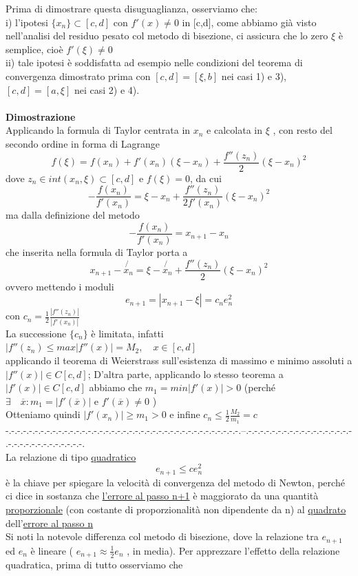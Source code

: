 \documentclass[12pt]{article}
\begin{document}
Prima di dimostrare questa disuguaglianza, osserviamo che:\\
i) l'ipotesi $\{x_n\} \subset [c,d]$ con $f'(x)\neq0$ in [c,d], come abbiamo già visto nell'analisi del residuo pesato col metodo di bisezione, ci assicura che lo zero $\xi$ è semplice, cioè $f'(\xi) \neq 0$\\
ii) tale ipotesi è soddisfatta ad esempio nelle condizioni del teorema di convergenza dimostrato prima con $[c,d] = [\xi, b]$ nei casi 1) e 3), $[c,d] = [a,\xi]$ nei casi 2) e 4).\\\\
\textbf{Dimostrazione}\\
Applicando la formula di Taylor centrata in $x_n$ e calcolata in $\xi $ , con resto del secondo ordine in forma di Lagrange
\[f(\xi)=f(x_n)+f'(x_n)(\xi-x_n)+\frac{f''(z_n)}{2}(\xi-x_n)^2\]
dove $z_n\in int(x_n,\xi)\subset [c,d]$ e $f(\xi)=0$, da cui 
\[-\frac{f(x_n)}{f'(x_n)}=\xi-x_n+\frac{f''(z_n)}{2f'(x_n)}(\xi-x_n)^2\]
ma dalla definizione del metodo
\[-\frac{f(x_n)}{f'(x_n)}=x_{n+1}-x_n\]
che inserita nella formula di Taylor porta a 
\[x_{n+1}-\not{x_n }=\xi-\not{x_n}+\frac{f''(z_n)}{2}(\xi-x_n)^2\]
ovvero mettendo i moduli
\[e_{n+1}=|x_{n+1}-\xi|=c_ne_n^2\]
con $ c_n=\frac{1}{2}\frac{|f''(z_n)|}{|f'(x_n)|}$\\
La successione $\{c_n\}$ è limitata, infatti $|f''(z_n)\leq max|f''(x)|=M_2,\quad x\in [c,d]$\\
applicando il teorema di Weierstrass sull'esistenza di massimo e minimo assoluti a $ |f''(x)|\in C[c,d]$; 
D'altra parte, applicando lo stesso teorema a  $ |f'(x)|\in C[c,d]$ abbiamo che $m_1=min|f'(x)|>0$ (perché $\exists \quad\overline{x}: m_1=|f'(\overline{x})| $  e    $f'(\overline{x})\neq 0$   )\\
Otteniamo quindi $|f'(x_n)|\geq m_1>0$    e infine $c_n \leq \frac{1}{2}\frac{M_2}{m_1}=c$ \\
-.-.-.-.-.-.-.-.-.-.-.-.-.-.-.-.-.-.-.-.-.-.-.-.-.-.-.-.-.-.-.-.-.-.-.-.-.-.-.-.--.-.-.-.-.-.-.-.-.-.-.-.-.-.-.-.-.-.-.-.-.-.-.-.-.-.-.-.-.-.-.-.\\
La relazione di tipo \underline{quadratico}
\[e_{n+1}\leq ce_n^2\]
è la chiave per spiegare la velocità di convergenza del metodo di Newton, perché ci dice in sostanza che \underline{l'errore  al passo n+1} è maggiorato da una quantità \underline{proporzionale} (con costante di proporzionalità non dipendente da n) al \underline{quadrato} dell'\underline{errore al passo n} \\
Si noti la notevole differenza col metodo di bisezione, dove la relazione tra $e_{n+1}$ ed $e_n$ è lineare ( $e_{n+1} \approx \frac{1}{2} e_n$ , in media). Per apprezzare l'effetto della relazione quadratica, prima di tutto osserviamo che \\
\end{document}
